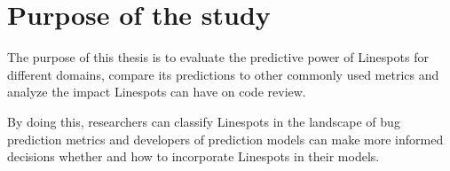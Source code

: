 \section{Purpose of the study}

The purpose of this thesis is to evaluate the predictive power of Linespots for different domains, compare its predictions to other commonly used metrics and analyze the impact Linespots can have on code review.

By doing this, researchers can classify Linespots in the landscape of bug prediction metrics and developers of prediction models can make more informed decisions whether and how to incorporate Linespots in their models.
